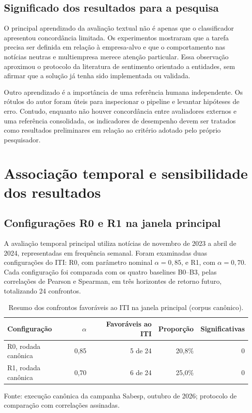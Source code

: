 \subsection{Significado dos resultados para a pesquisa}

O principal aprendizado da avaliação textual não é apenas que o classificador apresentou concordância limitada. Os experimentos mostraram que a tarefa precisa ser definida em relação à empresa-alvo e que o comportamento nas notícias neutras e multiempresa merece atenção particular. Essa observação aproximou o protocolo da literatura de sentimento orientado a entidades, sem afirmar que a solução já tenha sido implementada ou validada.

Outro aprendizado é a importância de uma referência humana independente. Os rótulos do autor foram úteis para inspecionar o pipeline e levantar hipóteses de erro. Contudo, enquanto não houver concordância entre avaliadores externos e uma referência consolidada, os indicadores de desempenho devem ser tratados como resultados preliminares em relação ao critério adotado pelo próprio pesquisador.

\section{Associação temporal e sensibilidade dos resultados}

\subsection{Configurações R0 e R1 na janela principal}

A avaliação temporal principal utiliza notícias de novembro de 2023 a abril de 2024, representadas em frequência semanal. Foram examinadas duas configurações do ITI: R0, com parâmetro nominal $\alpha=0{,}85$, e R1, com $\alpha=0{,}70$. Cada configuração foi comparada com os quatro baselines B0–B3, pelas correlações de Pearson e Spearman, em três horizontes de retorno futuro, totalizando 24 confrontos.

\begin{table}[htbp]
\centering
\caption{Resumo dos confrontos favoráveis ao ITI na janela principal (corpus canônico).}
\label{tab:r0-r1-canonico}
\begin{tabularx}{\textwidth}{|L|r|r|r|r|}
\hline
Configuração & $\alpha$ & Favoráveis ao ITI & Proporção & Significativas \\
\hline
R0, rodada canônica & 0,85 & 5 de 24 & 20,8\% & 0 \\
R1, rodada canônica & 0,70 & 6 de 24 & 25,0\% & 0 \\
\hline
\end{tabularx}
\vspace{0.5em}
{\footnotesize Fonte: execução canônica da campanha Sabesp, outubro de 2026; protocolo de comparação com correlações assinadas.}
\end{table}

